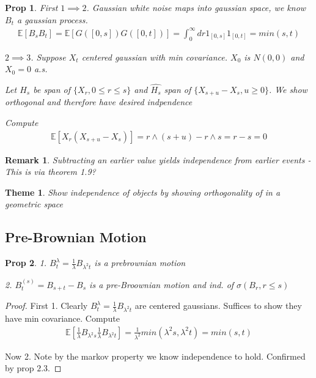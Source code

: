 \documentclass[11pt]{article}
\newcommand{\E}{\mathbb{E}}
\newtheorem{prop}{Prop}
\newtheorem{remark}{Remark}
\newtheorem{theme}{Theme}
\begin{document}
\begin{prop}
	First $1 \implies 2$. Gaussian white noise maps into gaussian space, we know $B_t$ a gaussian process. 
	\begin{align*}
		\E[B_s B_t] = \E[G([0,s])G([0,t])] = \int_0^{\infty} dr 1_{[0,s]}1_{[0,t]} = min(s,t)
	\end{align*}

	$2 \implies 3$. Suppose $X_t$ centered gaussian with min covariance. $X_0$ is $N(0,0)$ and $X_0 = 0$ a.s. 

	Let $H_s$ be span of $\{X_r, 0\leq r \leq s\}$ and $\hat{H_s}$ span of $\{X_{s+u}-X_s, u \geq 0\}$. We show orthogonal and therefore have desired indpendence

	Compute
	\begin{align*}
		\E[X_r(X_{s+u} - X_s)] = r \wedge (s+u) - r\wedge s = r - s = 0
	\end{align*}
\end{prop}

\begin{remark}
	Subtracting an earlier value yields independence from earlier events - This is via theorem 1.9?
\end{remark}

\begin{theme}
	Show independence of objects by showing orthogonality of in a geometric space
\end{theme}

\subsection{Pre-Brownian Motion}

\begin{prop}
	1. $B_t^{\lambda} = \frac{1}{\lambda}B_{\lambda^2 t}$ is a prebrownian motion

	2. $B_t^{(s)} = B_{s+t} - B_s$ is a pre-Broownian motion and ind. of $\sigma(B_r, r \leq s)$
\end{prop}

\begin{proof}
	First 1. Clearly $B_t^{\lambda} = \frac{1}{\lambda}B_{\lambda^2 t}$ are centered gaussians. Suffices to show they have min covariance. Compute
	\begin{align*}
		\E[\frac{1}{\lambda}B_{\lambda^2 s}\frac{1}{\lambda}B_{\lambda^2 t}] = \frac{1}{\lambda^2} min(\lambda^2s,\lambda^2 t) = min(s,t)
	\end{align*}

	Now 2. Note by the markov property we know independence to hold. Confirmed by prop $2.3$. 
\end{proof}
\end{document}
